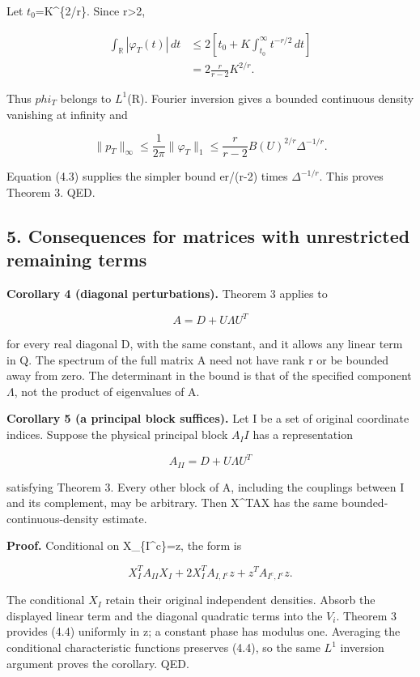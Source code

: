\documentclass[
  11pt,
]{article}
\begin{document}
Let \(t_0\)=K\^{}\{2/r\}. Since r\textgreater2,

\[
\begin{aligned}
\int_{\mathbb R}|\varphi_T(t)|\,dt
&\le2\left[t_0+K\int_{t_0}^\infty t^{-r/2}\,dt\right]\\
&=2\frac{r}{r-2}K^{2/r}.
\end{aligned}
\]

Thus \(phi_T\) belongs to \(L^1\)(R). Fourier inversion gives a bounded
continuous density vanishing at infinity and

\[
\lVert p_T\rVert_\infty
\le\frac1{2\pi}\lVert\varphi_T\rVert_1
\le\frac{r}{r-2}B(U)^{2/r}\Delta^{-1/r}.
\]

Equation (4.3) supplies the simpler bound er/(r-2) times
\(\Delta^{-1/r}\). This proves Theorem 3. QED.

\subsection{5. Consequences for matrices with unrestricted remaining
terms}\label{consequences-for-matrices-with-unrestricted-remaining-terms}

\textbf{Corollary 4 (diagonal perturbations).} Theorem 3 applies to

\[
A=D+U\Lambda U^T
\]

for every real diagonal D, with the same constant, and it allows any
linear term in Q. The spectrum of the full matrix A need not have rank r
or be bounded away from zero. The determinant in the bound is that of
the specified component \(\Lambda\), not the product of eigenvalues of
A.

\textbf{Corollary 5 (a principal block suffices).} Let I be a set of
original coordinate indices. Suppose the physical principal block
\(A_II\) has a representation

\[
A_{II}=D+U\Lambda U^T
\]

satisfying Theorem 3. Every other block of A, including the couplings
between I and its complement, may be arbitrary. Then X\^{}TAX has the
same bounded-continuous-density estimate.

\textbf{Proof.} Conditional on X\_\{I\^{}c\}=z, the form is

\[
X_I^TA_{II}X_I+2X_I^TA_{I,I^c}z+z^TA_{I^c,I^c}z.
\]

The conditional \(X_I\) retain their original independent densities.
Absorb the displayed linear term and the diagonal quadratic terms into
the \(V_i\). Theorem 3 provides (4.4) uniformly in z; a constant phase
has modulus one. Averaging the conditional characteristic functions
preserves (4.4), so the same \(L^1\) inversion argument proves the
corollary. QED.
\end{document}
